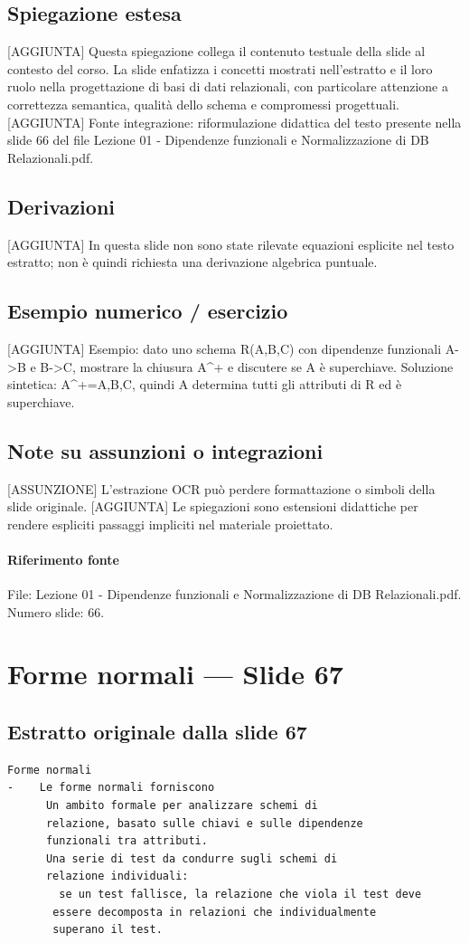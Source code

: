 \documentclass[11pt]{article}
\begin{document}
\subsection*{Spiegazione estesa}
[AGGIUNTA] Questa spiegazione collega il contenuto testuale della slide al contesto del corso. La slide enfatizza i concetti mostrati nell'estratto e il loro ruolo nella progettazione di basi di dati relazionali, con particolare attenzione a correttezza semantica, qualità dello schema e compromessi progettuali.
[AGGIUNTA] Fonte integrazione: riformulazione didattica del testo presente nella slide 66 del file Lezione 01 - Dipendenze funzionali e Normalizzazione di DB Relazionali.pdf.
\subsection*{Derivazioni}
[AGGIUNTA] In questa slide non sono state rilevate equazioni esplicite nel testo estratto; non è quindi richiesta una derivazione algebrica puntuale.
\subsection*{Esempio numerico / esercizio}
[AGGIUNTA] Esempio: dato uno schema R(A,B,C) con dipendenze funzionali A->B e B->C, mostrare la chiusura A^+ e discutere se A è superchiave. Soluzione sintetica: A^+={A,B,C}, quindi A determina tutti gli attributi di R ed è superchiave.
\subsection*{Note su assunzioni o integrazioni}
[ASSUNZIONE] L'estrazione OCR può perdere formattazione o simboli della slide originale.
[AGGIUNTA] Le spiegazioni sono estensioni didattiche per rendere espliciti passaggi impliciti nel materiale proiettato.
\paragraph{Riferimento fonte} File: Lezione 01 - Dipendenze funzionali e Normalizzazione di DB Relazionali.pdf. Numero slide: 66.
\section{Forme normali --- Slide 67}
\subsection*{Estratto originale dalla slide 67}
\begin{lstlisting}
Forme normali
-    Le forme normali forniscono
      Un ambito formale per analizzare schemi di
      relazione, basato sulle chiavi e sulle dipendenze
      funzionali tra attributi.
      Una serie di test da condurre sugli schemi di
      relazione individuali:
        se un test fallisce, la relazione che viola il test deve
       essere decomposta in relazioni che individualmente
       superano il test.
\end{lstlisting}
\end{document}
